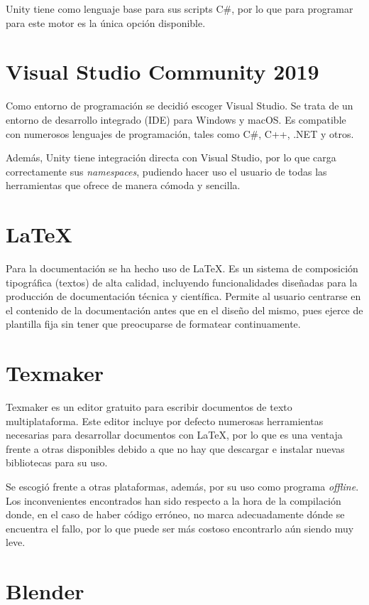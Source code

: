 Unity tiene como lenguaje base para sus scripts C\#, por lo que para programar para este motor es la única opción disponible.

\section{Visual Studio Community 2019}

Como entorno de programación se decidió escoger Visual Studio. Se trata de un entorno de desarrollo integrado (IDE) para Windows y macOS. Es compatible con numerosos lenguajes de programación, tales como C\#, C++, .NET y otros. 

Además, Unity tiene integración directa con Visual Studio, por lo que carga correctamente sus \textit{namespaces}, pudiendo hacer uso el usuario de todas las herramientas que ofrece de manera cómoda y sencilla.

\section{LaTeX}

Para la documentación se ha hecho uso de LaTeX. Es un sistema de composición tipográfica (textos) de alta calidad, incluyendo funcionalidades diseñadas para la producción de documentación técnica y científica. Permite al usuario centrarse en el contenido de la documentación antes que en el diseño del mismo, pues ejerce de plantilla fija sin tener que preocuparse de formatear continuamente.

\section{Texmaker}

Texmaker es un editor gratuito para escribir documentos de texto multiplataforma. Este editor incluye por defecto numerosas herramientas necesarias para desarrollar documentos con LaTeX, por lo que es una ventaja frente a otras disponibles debido a que no hay que descargar e instalar nuevas bibliotecas para su uso.

Se escogió frente a otras plataformas, además, por su uso como programa \textit{offline}. Los inconvenientes encontrados han sido respecto a la hora de la compilación donde, en el caso de haber código erróneo, no marca adecuadamente dónde se encuentra el fallo, por lo que puede ser más costoso encontrarlo aún siendo muy leve.

\section{Blender}

